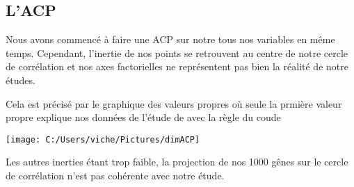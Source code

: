 \documentclass[]{article}
\begin{document}
\hypertarget{lacp}{%
\subsection{L'ACP}\label{lacp}}

Nous avons commencé à faire une ACP sur notre tous nos variables en même
temps. Cependant, l'inertie de nos points se retrouvent au centre de
notre cercle de corrélation et nos axes factorielles ne représentent pas
bien la réalité de notre études.

Cela est précisé par le graphique des valeurs propres où seule la
prmière valeur propre explique nos données de l'étude de avec la règle
du coude

\begin{center}\texttt{[image: C:/Users/viche/Pictures/dimACP]} \end{center}

Les autres inerties étant trop faible, la projection de nos 1000 gênes
sur le cercle de corrélation n'est pas cohérente avec notre étude.
\end{document}
